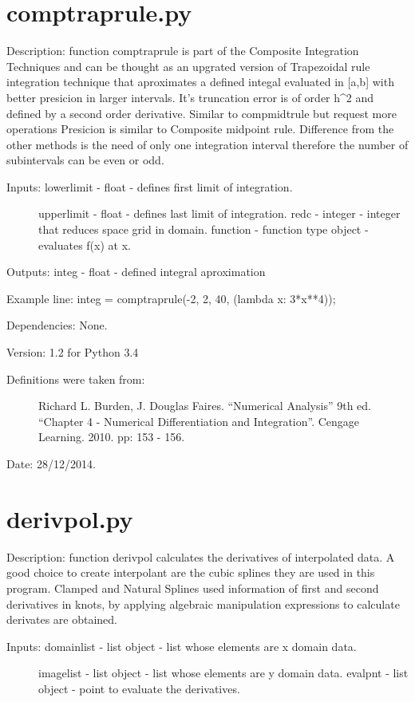 \documentclass[letterpaper,10pt,oneside]{sphinxmanual}
\theoremstyle{plain}%
\theoremstyle{definition}%
\theoremstyle{remark}%
\begin{document}
\section{comptraprule.py}
\label{code:module-comptraprule}\label{code:comptraprule-py}
Description: function comptraprule is part of the Composite Integration
Techniques and can be thought as an upgrated version of Trapezoidal rule
integration technique that aproximates a defined integal evaluated in {[}a,b{]}
with better presicion in larger intervals. It's truncation error is of order
h\textasciicircum{}2 and defined by a second order derivative. Similar to compmidtrule but
request more operations Presicion is similar to Composite midpoint rule.
Difference from the other methods is the need of only one integration interval
therefore the number of subintervals can be even or odd.
\begin{description}
\item[{Inputs: lowerlimit - float - defines first limit of integration.}] \leavevmode
upperlimit - float - defines last limit of integration.
redc - integer - integer that reduces space grid in domain.
function - function type object - evaluates f(x) at x.

\end{description}

Outputs: integ - float - defined integral aproximation

Example line: integ = comptraprule(-2, 2, 40, (lambda x: 3*x**4));

Dependencies: None.

Version: 1.2 for Python 3.4
\begin{description}
\item[{Definitions were taken from:}] \leavevmode
Richard L. Burden, J. Douglas Faires. ``Numerical Analysis'' 9th ed.
``Chapter 4 - Numerical Differentiation and Integration''. 
Cengage Learning. 2010. pp: 153 - 156.

\end{description}




Date: 28/12/2014.


\section{derivpol.py}
\label{code:module-derivpol}\label{code:derivpol-py}
Description: function derivpol calculates the derivatives of interpolated
data. A good choice to create interpolant are the cubic splines they are
used in this program. Clamped and Natural Splines used information of
first and second derivatives in knots, by applying algebraic manipulation
expressions to calculate derivates are obtained.
\begin{description}
\item[{Inputs: domainlist - list object - list whose elements are x domain data.}] \leavevmode
imagelist - list object - list whose elements are y domain data.
evalpnt - list object - point to evaluate the derivatives.

\end{description}
\end{document}
